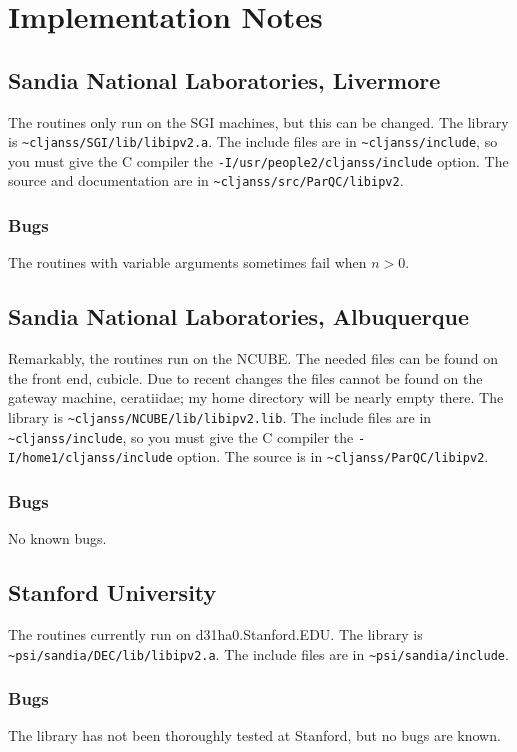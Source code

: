 \section{Implementation Notes}

\subsection{Sandia National Laboratories, Livermore}
The \libip{} routines only run on the SGI machines, but this can be
changed.  The library
is \verb|~cljanss/SGI/lib/libipv2.a|.  The include
files are in \verb|~cljanss/include|, so you must
give the C compiler the \verb|-I/usr/people2/cljanss/include| option.
The source and documentation are in \verb|~cljanss/src/ParQC/libipv2|.

\subsubsection{Bugs}
The routines with variable arguments sometimes fail when $n > 0$.

\subsection{Sandia National Laboratories, Albuquerque}
Remarkably, the \libip{} routines run on the NCUBE.  The needed files
can be found on the front end, cubicle.  Due to recent changes the files
cannot be found on the gateway machine, ceratiidae; my home directory
will be nearly empty there.
The library
is \verb|~cljanss/NCUBE/lib/libipv2.lib|.  The include
files are in \verb|~cljanss/include|, so you must
give the C compiler the \verb|-I/home1/cljanss/include| option.
The source is in \verb|~cljanss/ParQC/libipv2|.

\subsubsection{Bugs}
No known bugs.

\subsection{Stanford University}
The \libip{} routines currently run on d31ha0.Stanford.EDU.
The library is \verb|~psi/sandia/DEC/lib/libipv2.a|.  The include
files are in \verb|~psi/sandia/include|.

\subsubsection{Bugs}
The \libip{} library has not been thoroughly tested at Stanford, but no bugs
are known.


